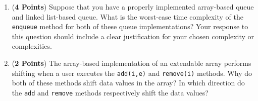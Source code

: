 \documentclass[12pt]{article}
\begin{document}
\begin{enumerate}
\begin{enumerate}




  \item ({\bf 4 Points}) Suppose that you have a properly implemented array-based queue and linked list-based queue.
    What is the worst-case time complexity of the {\tt enqueue} method for both of these queue implementations?  Your
    response to this question should include a clear justification for your chosen complexity or complexities.

  \item ({\bf 2 Points}) The array-based implementation of an extendable array performs shifting when a user executes
    the {\tt add(i,e)} and {\tt remove(i)} methods.  Why do both of these methods shift data values in the array?  In
    which direction do the {\tt add} and {\tt remove} methods respectively shift the data values?


\end{enumerate}
\end{enumerate}
\end{document}
